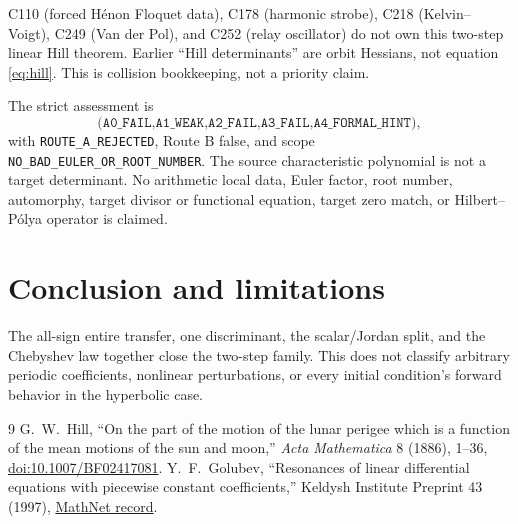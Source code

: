 \documentclass[10pt]{article}
\begin{document}
C110 (forced H\'enon Floquet data), C178 (harmonic strobe), C218
(Kelvin--Voigt), C249 (Van der Pol), and C252 (relay oscillator) do not own
this two-step linear Hill theorem.  Earlier ``Hill determinants'' are orbit
Hessians, not equation \eqref{eq:hill}.  This is collision bookkeeping, not
a priority claim.

The strict assessment is
\[
\texttt{(A0\_FAIL,A1\_WEAK,A2\_FAIL,A3\_FAIL,A4\_FORMAL\_HINT)},
\]
with \texttt{ROUTE\_A\_REJECTED}, Route B false, and scope
\texttt{NO\_BAD\_EULER\_OR\_ROOT\_NUMBER}.  The source characteristic
polynomial is not a target determinant.  No arithmetic local data, Euler
factor, root number, automorphy, target divisor or functional equation,
target zero match, or Hilbert--P\'olya operator is claimed.
\fi

\section{Conclusion and limitations}
The all-sign entire transfer, one discriminant, the scalar/Jordan split, and
the Chebyshev law together close the two-step family.  This does not classify
arbitrary periodic coefficients, nonlinear perturbations, or every initial
condition's forward behavior in the hyperbolic case.

\begin{thebibliography}{9}
 G.~W.~Hill, ``On the part of the motion of the lunar
perigee which is a function of the mean motions of the sun and moon,''
\emph{Acta Mathematica} 8 (1886), 1--36,
\href{https://doi.org/10.1007/BF02417081}{doi:10.1007/BF02417081}.
 Y.~F.~Golubev, ``Resonances of linear differential
equations with piecewise constant coefficients,'' Keldysh Institute Preprint
43 (1997), \href{https://www.mathnet.ru/eng/ipmp1431}{MathNet record}.
\end{thebibliography}
\end{document}

